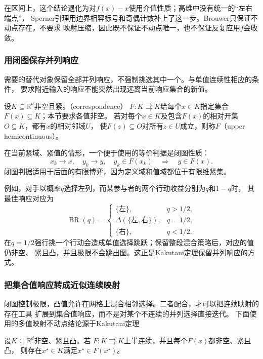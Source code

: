 在区间上，这个结论退化为对\(f(x)-x\)使用介值性质；高维中没有统一的“左右端点”，
Sperner引理用边界相容标号和奇偶计数补上了这一步。Brouwer只保证不动点存在，不要求
映射压缩，因此既不保证不动点唯一，也不保证反复应用\(f\)会收敛。

\subsubsection{用闭图保存并列响应}

需要的替代对象保留全部并列响应，不强制挑选其中一个。与单值连续性相应的条件，
要求附近输入的响应不能突然出现远离当前响应集合的新值。
\begin{definition}[集合值映射与上半连续性]
\label{def:game-upper-hemicontinuous-correspondence}
设$K\subseteq\mathbb R^d$非空且紧。（correspondence）
\(F:K\rightrightarrows K\)给每个$x\in K$指定集合$F(x)\subseteq K$；本节要求各值非空。
若对每个$x\in K$及包含$F(x)$的相对开集$O\subseteq K$，都有$x$的相对邻域$U$，
使$F(z)\subseteq O$对所有$z\in U$成立，则称$F$（upper hemicontinuous）。
\end{definition}
在当前紧域、紧值的情形，一个便于使用的等价判据是闭图性质：
\[
  x_k\to x,\quad y_k\to y,\quad y_k\in F(x_k)
  \quad\Longrightarrow\quad
  y\in F(x).
\]
闭图判据适用于后面的有限博弈，因为定义域和值域都位于有限维紧集。

例如，对手以概率\(q\)选择左列，而某参与者的两个行动收益分别为\(q\)和\(1-q\)时，
其最佳响应对应为
\[
  \operatorname{BR}(q)
  =
  \begin{cases}
    \{\text{左}\},&q>1/2,\\
    \Delta(\{\text{左},\text{右}\}),&q=1/2,\\
    \{\text{右}\},&q<1/2.
  \end{cases}
\]
在\(q=1/2\)强行挑一个行动会造成单值选择跳跃；保留整段混合策略后，对应的值仍非空、
紧且凸，并且极限不会跳出图。这正是Kakutani定理保留并列响应的方式。

\subsubsection{把集合值响应转成近似连续映射}

闭图控制极限，凸值允许在网格上混合相邻选择。二者配合，才可以把连续映射的存在工具
扩展到集合值响应，而不是对某个不连续的并列选择直接迭代。
下面使用的多值映射不动点结论源于Kakutani定理
\begin{theorem}[Kakutani不动点定理]
\label{thm:game-kakutani}
设\(K\subseteq\mathbb{R}^d\)非空、紧且凸。若
\(F:K\rightrightarrows K\)上半连续，并且每个\(F(x)\)都非空、紧且凸，
则存在\(x^\star\in K\)满足\(x^\star\in F(x^\star)\)。
\end{theorem}

